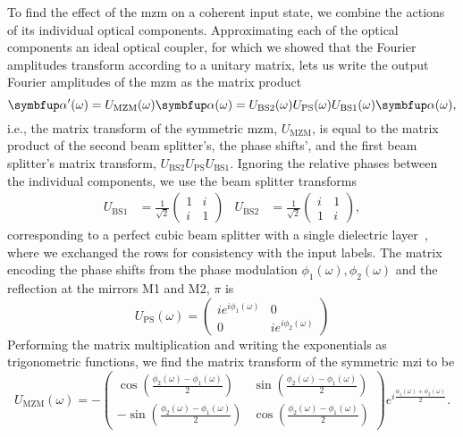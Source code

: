 To find the effect of the \gls{mzm} on a coherent input state, we combine the actions of its individual optical components.
Approximating each of the optical components an ideal optical coupler, for which we showed that the Fourier amplitudes transform according to a unitary matrix, lets us write the output Fourier amplitudes of the \gls{mzm} as the matrix product
\begin{equation}
	\vb{\alpha}^\prime(\omega)
	=
	U_\text{MZM}(\omega)
	\vb{\alpha}(\omega)
	=
	U_\text{BS2}(\omega)
	U_\text{PS}(\omega)
	U_\text{BS1}(\omega)
	\vb{\alpha}(\omega)
	\label{eq:mzm_fourier}
	,
\end{equation}
i.e., the matrix transform of the symmetric \gls{mzm}, $U_\text{MZM}$, is equal to the matrix product of the second beam splitter's, the phase shifts', and the first beam splitter's matrix transform, $U_\text{BS2}U_\text{PS}U_\text{BS1}$.
Ignoring the relative phases between the individual components, we use the beam splitter transforms
\begin{align}
	U_\text{BS1}
	&=
	\frac{1}{\sqrt{2}}
	\begin{pmatrix}
		1 & i \\
		i & 1
	\end{pmatrix}
	&
	U_\text{BS2}
	&=
	\frac{1}{\sqrt{2}}
	\begin{pmatrix}
		i & 1 \\
		1 & i
	\end{pmatrix}
	,
\end{align}
corresponding to a perfect cubic beam splitter with a single dielectric layer~\cite[p.~139]{Gerry2005}, where we exchanged the rows for consistency with the input labels.
The matrix encoding the phase shifts from the phase modulation $\phi_1(\omega),\phi_2(\omega)$ and the reflection at the mirrors M1 and M2, $\pi$ is
\begin{equation}
	U_\text{PS}(\omega)
	=
	\begin{pmatrix}
		ie^{i\phi_1(\omega)} & 0 \\
		0 & ie^{i\phi_2(\omega)}
	\end{pmatrix}
\end{equation}
Performing the matrix multiplication and writing the exponentials as trigonometric functions, we find the matrix transform of the symmetric \gls{mzi} to be
\begin{equation}
	U_\text{MZM}(\omega)
	=
	-
	\begin{pmatrix}
		\cos\left(\frac{\phi_2(\omega)-\phi_1(\omega)}{2}\right) & \sin\left(\frac{\phi_2(\omega)-\phi_1(\omega)}{2}\right) \\
		-\sin\left(\frac{\phi_2(\omega)-\phi_1(\omega)}{2}\right) & \cos\left(\frac{\phi_2(\omega)-\phi_1(\omega)}{2}\right)
	\end{pmatrix}
	e^{i\frac{\phi_1(\omega)+\phi_2(\omega)}{2}}
	\label{eq:mzm_matrix1}
	.
\end{equation}
